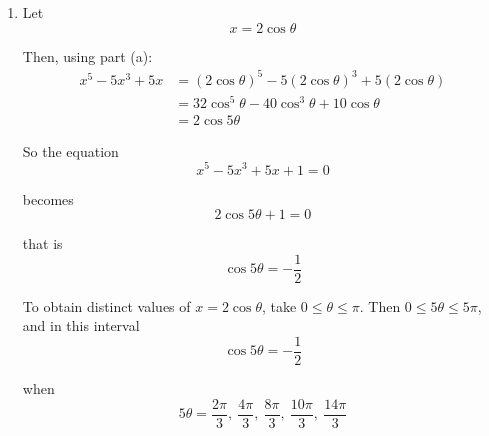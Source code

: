 \documentclass[leqno]{article}
\begin{document}
\begin{enumerate}[
  label=\textbf{\arabic*.},
  leftmargin=*,
  topsep=0pt,
  partopsep=0pt,
  parsep=0pt
]
\begin{djsSolution}
\begin{enumerate}[label=\textbf{(\alph*)}]
Expand the left-hand side using the binomial theorem:
\begin{align*}
(\cos\theta+i\sin\theta)^5
&= \cos^5\theta+5i\cos^4\theta\sin\theta+10i^2\cos^3\theta\sin^2\theta \\
&\qquad +10i^3\cos^2\theta\sin^3\theta+5i^4\cos\theta\sin^4\theta+i^5\sin^5\theta \\
&= \cos^5\theta+5i\cos^4\theta\sin\theta-10\cos^3\theta\sin^2\theta \\
&\qquad -10i\cos^2\theta\sin^3\theta+5\cos\theta\sin^4\theta+i\sin^5\theta
\end{align*}

Equating real parts gives
\[
\cos5\theta=\cos^5\theta-10\cos^3\theta\sin^2\theta+5\cos\theta\sin^4\theta
\]

Now use
\[
\sin^2\theta=1-\cos^2\theta
\qquad\text{and}\qquad
\sin^4\theta=(1-\cos^2\theta)^2
\]

So
\begin{align*}
\cos5\theta
&=\cos^5\theta-10\cos^3\theta(1-\cos^2\theta)+5\cos\theta(1-\cos^2\theta)^2 \\
&=\cos^5\theta-10\cos^3\theta+10\cos^5\theta+5\cos\theta(1-2\cos^2\theta+\cos^4\theta) \\
&=\cos^5\theta-10\cos^3\theta+10\cos^5\theta+5\cos\theta-10\cos^3\theta+5\cos^5\theta \\
&=16\cos^5\theta-20\cos^3\theta+5\cos\theta
\end{align*}

Multiplying by 2:
\[
2\cos5\theta=32\cos^5\theta-40\cos^3\theta+10\cos\theta
\]

  \item Let
\[
x=2\cos\theta
\]

Then, using part (a):
\begin{align*}
x^5-5x^3+5x
&=(2\cos\theta)^5-5(2\cos\theta)^3+5(2\cos\theta) \\
&=32\cos^5\theta-40\cos^3\theta+10\cos\theta \\
&=2\cos5\theta
\end{align*}

So the equation
\[
x^5-5x^3+5x+1=0
\]

becomes
\[
2\cos5\theta+1=0
\]

that is
\[
\cos5\theta=-\frac12
\]

To obtain distinct values of \(x=2\cos\theta\), take \(0\le \theta\le \pi\). Then \(0\le 5\theta\le 5\pi\), and in this interval
\[
\cos5\theta=-\frac12
\]

when
\[
5\theta=\frac{2\pi}{3},\ \frac{4\pi}{3},\ \frac{8\pi}{3},\ \frac{10\pi}{3},\ \frac{14\pi}{3}
\]


\end{enumerate}
\end{djsSolution}
\end{enumerate}
\end{document}
